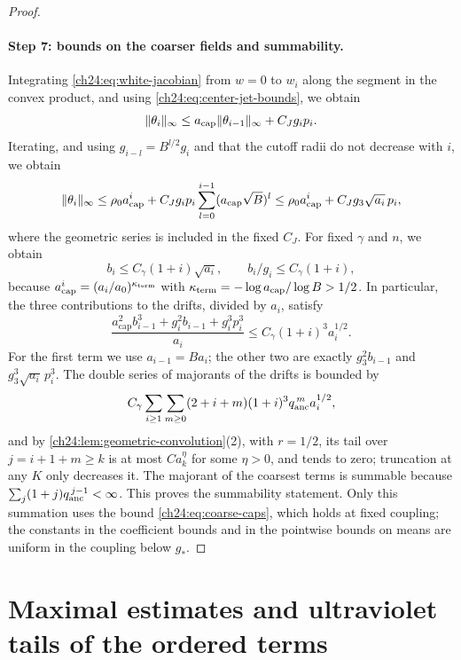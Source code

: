 \begin{proof}
\paragraph{Step 7: bounds on the coarser fields and summability.}
Integrating \eqref{ch24:eq:white-jacobian} from $w=0$ to $w_i$ along the segment in the convex product, and using \eqref{ch24:eq:center-jet-bounds}, we obtain
\[
 \lVert \theta_i\rVert_\infty\le a_{\mathrm{cap}}\lVert \theta_{i-1}\rVert_\infty+C_Jg_ip_i.
\]
Iterating, and using $g_{i-l}=B^{l/2}g_i$ and that the cutoff radii do not decrease with $i$, we obtain
\[
 \lVert \theta_i\rVert_\infty\le\rho_0a_{\mathrm{cap}}^i+C_Jg_ip_i\sum_{l=0}^{i-1}(a_{\mathrm{cap}}\sqrt B)^l\le\rho_0a_{\mathrm{cap}}^i+C_Jg_3\sqrt{a_i}\,p_i,
\]
where the geometric series is included in the fixed $C_J$. For fixed $\gamma$ and $n$, we obtain
\begin{equation}\label{ch24:eq:coarse-caps}
 b_i\le C_\gamma(1+i)\sqrt{a_i},\qquad b_i/g_i\le C_\gamma(1+i),
\end{equation}
because $a_{\mathrm{cap}}^i=(a_i/a_0)^{\kappa_{\mathrm{term}}}$ with $\kappa_{\mathrm{term}}=-\log a_{\mathrm{cap}}/\log B>1/2$. In particular, the three contributions to the drifts, divided by $a_i$, satisfy
\begin{equation}\label{ch24:eq:mean-majorant}
 \frac{a_{\mathrm{cap}}^2b_{i-1}^3+g_i^2b_{i-1}+g_i^3p_i^3}{a_i}\le C_\gamma(1+i)^3a_i^{1/2}.
\end{equation}
For the first term we use $a_{i-1}=Ba_i$; the other two are exactly $g_3^2b_{i-1}$ and $g_3^3\sqrt{a_i}\,p_i^3$. The double series of majorants of the drifts is bounded by
\[
 C_\gamma\sum_{i\ge1}\sum_{m\ge0}(2+i+m)(1+i)^3q_{\mathrm{anc}}^{\,m}a_i^{1/2},
\]
and by \cref{ch24:lem:geometric-convolution}(2), with $r=1/2$, its tail over $j=i+1+m\ge k$ is at most $Ca_k^\eta$ for some $\eta>0$, and tends to zero; truncation at any $K$ only decreases it. The majorant of the coarsest terms is summable because $\sum_j(1+j)q_{\mathrm{anc}}^{\,j-1}<\infty$. This proves the summability statement. Only this summation uses the bound \eqref{ch24:eq:coarse-caps}, which holds at fixed coupling; the constants in the coefficient bounds and in the pointwise bounds on means are uniform in the coupling below $g_*$.
\end{proof}

\section{Maximal estimates and ultraviolet tails of the ordered terms}\label{ch24:sec:ordered}

